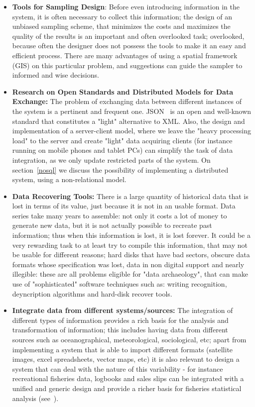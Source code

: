 \documentclass[11pt]{article} %
\begin{document}
\begin{itemize}
  \item \textbf{Tools for Sampling Design}: Before even introducing information in the system, it is often necessary to collect this information; the design of an unbiased sampling scheme, that minimizes the costs and maximizes the quality of the results is an important and often overlooked task; overlooked, because often the designer does not possess the tools to make it an easy and efficient process. There are many advantages of using a spatial framework (GIS) on this particular problem, and suggestions can guide the sampler to informed and wise decisions.
  \item \textbf{Research on Open Standards and Distributed Models for Data Exchange:} The problem of exchanging data between different instances of the system is a pertinent and frequent one. JSON~\cite{json} %
is an open and well-known standard that constitutes a "light" alternative to XML. Also, the design and implementation of a server-client model, where we leave the "heavy processing load" to the server and create "light" data acquiring clients (for instance running on mobile phones and tablet PCs) can simplify the task of data integration, as we only update restricted parts of the system. On section~\ref{nosql} we discuss the possibility of implementing a distributed system, using a non-relational model.
  \item \textbf{Data Recovering Tools:} There is a large quantity of historical data that is lost in terms of its value, just because it is not in an usable format. Data series take many years to assemble: not only it costs a lot of money to generate new data, but it is not actually possible to recreate past information; thus when this information is lost, it is lost forever. It could be a very rewarding task to at least try to compile this information, that may not be usable for different reasons; hard disks that have bad sectors, obscure data formats whose specification was lost, data in non digital support and nearly illegible: these are all problems eligible for "data archaeology", that can make use of "sophisticated" software techniques such as: writing recognition, deyncription algorithms and hard-disk recover tools.
  \item \textbf{Integrate data from different systems/sources:} The integration of different types of information provides a rich basis for the analysis and transformation of information; this includes having data from different sources such as oceanographical, meteorological, sociological, etc; apart from implementing a system that is able to import different formats (satellite images, excel spreadsheets, vector maps, etc) it is also relevant to design a system that can deal with the nature of this variability - for instance recreational fisheries data, logbooks and sales slips can be integrated with a unified and generic design and provide a richer basis for fisheries statistical analysis (see~\cite{medfisis}).

\end{itemize}
\end{document}
